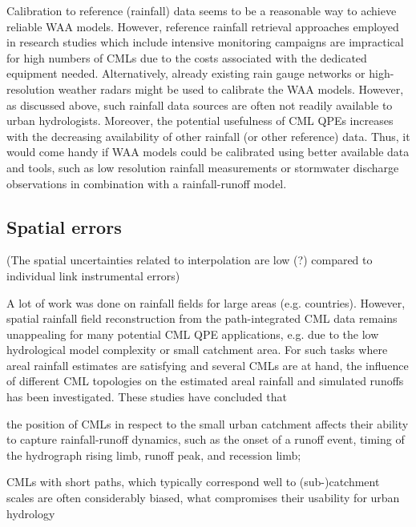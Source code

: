 \documentclass{ctuthesis}\usepackage[]{graphicx}\usepackage[]{color}
\begin{document}
Calibration to reference (rainfall) data seems to be a reasonable way to achieve reliable WAA models. However, reference rainfall retrieval approaches employed in research studies which include intensive monitoring campaigns \citep[e.g.][]{schleissQuantificationModelingWetAntenna2013, lethMeasurementCampaignAssess2018} are impractical for high numbers of CMLs due to the costs associated with the dedicated equipment needed. Alternatively, already existing rain gauge networks or high-resolution weather radars might be used to calibrate the WAA models. However, as discussed above, such rainfall data sources are often not readily available to urban hydrologists. Moreover, the potential usefulness of CML QPEs increases with the decreasing availability of other rainfall (or other reference) data. Thus, it would come handy if WAA models could be calibrated using better available data and tools, such as low resolution rainfall measurements or stormwater discharge observations in combination with a rainfall-runoff model.



\subsection{Spatial errors}
(The spatial uncertainties related to interpolation are low (?) compared to individual link instrumental errors)

A lot of work was done on rainfall fields for large areas (e.g. countries). However, spatial rainfall field reconstruction from the path-integrated CML data \citep{damicoUseOperationalMicrowave2016, goldshteinRainRateEstimation2009, haeseStochasticReconstructionInterpolation2017} remains unappealing for many potential CML QPE applications, e.g. due to the low hydrological model complexity or small catchment area. For such tasks where areal rainfall estimates are satisfying and several CMLs are at hand, the influence of different CML topologies on the estimated areal rainfall \citep{fenclCommercialMicrowaveLinks2015} and simulated runoffs \citep{pastorekCommercialMicrowaveLinks2019} has been investigated. These studies have concluded that

the position of CMLs in respect to the small urban catchment affects their ability to capture rainfall-runoff dynamics, such as the onset of a runoff event, timing of the hydrograph rising limb, runoff peak, and recession limb;

CMLs with short paths, which typically correspond well to (sub-)catchment scales are often considerably biased, what compromises their usability for urban hydrology
\end{document}
